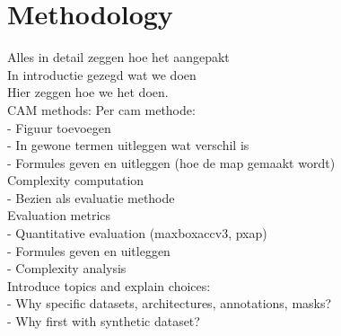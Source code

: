 \chapter{Methodology}

Alles in detail zeggen hoe het aangepakt \\
In introductie gezegd wat we doen \\
Hier zeggen hoe we het doen. \\
CAM methods: Per cam methode: \\
- Figuur toevoegen \\
- In gewone termen uitleggen wat verschil is \\
- Formules geven en uitleggen (hoe de map gemaakt wordt) \\
Complexity computation \\
- Bezien als evaluatie methode \\
Evaluation metrics \\
- Quantitative evaluation (maxboxaccv3, pxap) \\
- Formules geven en uitleggen \\
- Complexity analysis \\

Introduce topics and explain choices:\\
- Why specific datasets, architectures, annotations, masks?\\
- Why first with synthetic dataset?\\


